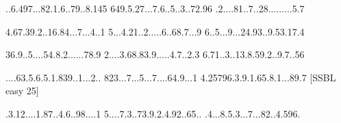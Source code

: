 \documentclass{article}
\begin{document}
\renewcommand*{\puzzlefile}{se10.sud}
\writepuzzle%
{..6.497..}{.82.1.6..}{79..8.145}%
{649.5.27.}{..7.6..5.}{.3..72.96}%
{.2....81.}{.7..28...}{......5.7}%
\vfill
\begin{minipage}{0.95\linewidth}\begin{center}
\end{center}\end{minipage}

\renewcommand*{\puzzlefile}{se15.sud}
\writepuzzle%
{4.67.39.2}{..16.84..}{.7...4..1}%
{5...4.21.}{.2.....6.}{.68.7...9}%
{6..5...9.}{..24.93..}{9.53.17.4}%
\vfill
\begin{minipage}{0.95\linewidth}\begin{center}
\end{center}\end{minipage}

\renewcommand*{\puzzlefile}{se20.sud}
\writepuzzle%
{36.9..5..}{..54.8.2.}{.....78.9}%
{2....3.68}{.83.9....}{.4.7..2.3}%
{6.71..3..}{13.8.59.2}{..9.7..56}%
\vfill
\begin{minipage}{0.95\linewidth}\begin{center}
\end{center}\end{minipage}

\renewcommand*{\puzzlefile}{se25.sud}
\writepuzzle%
{....63.5.}{6.5.1.839}{..1...2..}%
{823...7..}{.5...7...}{.64.9...1}%
{4.25796.3}{.9.1.65.8}{.1...89.7}%
[SSBL easy 25]
\vfill
\begin{minipage}{0.95\linewidth}\begin{center}
\end{center}\end{minipage}

\renewcommand*{\puzzlefile}{se30.sud}
\writepuzzle%
{.3.12....}{1.87..4.6}{..98....1}%
{5....7.3.}{.73.9.2.4}{.92..65..}%
{.4...8.5.}{3...7...8}{2..4.596.}%
\vfill
\begin{minipage}{0.95\linewidth}\begin{center}
\end{center}\end{minipage}
\end{document}
